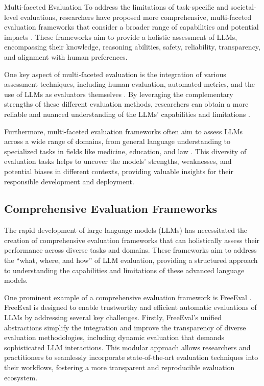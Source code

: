 \documentclass[11pt]{article}
\begin{document}
Multi-faceted Evaluation
To address the limitations of task-specific and societal-level evaluations, researchers have proposed more comprehensive, multi-faceted evaluation frameworks that consider a broader range of capabilities and potential impacts \cite{ref11,ref70}. These frameworks aim to provide a holistic assessment of LLMs, encompassing their knowledge, reasoning abilities, safety, reliability, transparency, and alignment with human preferences.

One key aspect of multi-faceted evaluation is the integration of various assessment techniques, including human evaluation, automated metrics, and the use of LLMs as evaluators themselves \cite{ref71,ref72}. By leveraging the complementary strengths of these different evaluation methods, researchers can obtain a more reliable and nuanced understanding of the LLMs' capabilities and limitations \cite{ref56,ref73}.

Furthermore, multi-faceted evaluation frameworks often aim to assess LLMs across a wide range of domains, from general language understanding to specialized tasks in fields like medicine, education, and law \cite{ref74,ref75}. This diversity of evaluation tasks helps to uncover the models' strengths, weaknesses, and potential biases in different contexts, providing valuable insights for their responsible development and deployment.

\subsection{Comprehensive Evaluation Frameworks}

The rapid development of large language models (LLMs) has necessitated the creation of comprehensive evaluation frameworks that can holistically assess their performance across diverse tasks and domains. These frameworks aim to address the ``what, where, and how'' of LLM evaluation, providing a structured approach to understanding the capabilities and limitations of these advanced language models.

One prominent example of a comprehensive evaluation framework is FreeEval \cite{ref76}. FreeEval is designed to enable trustworthy and efficient automatic evaluations of LLMs by addressing several key challenges. Firstly, FreeEval's unified abstractions simplify the integration and improve the transparency of diverse evaluation methodologies, including dynamic evaluation that demands sophisticated LLM interactions. This modular approach allows researchers and practitioners to seamlessly incorporate state-of-the-art evaluation techniques into their workflows, fostering a more transparent and reproducible evaluation ecosystem.
\end{document}
